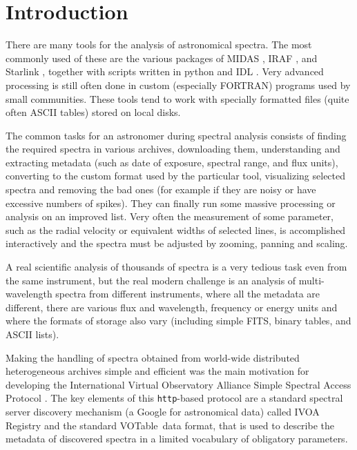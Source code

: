 \documentclass[final,authoryear,5p,times,twocolumn]{elsarticle}
\newcommand{\ssap}{\texttt{SSAP}}
\newcommand{\votable}{VOTable}
\newcommand{\ascl}[1]{\href{http://www.ascl.net/#1}{ascl:#1}}
\begin{document}
\section{Introduction}

There are many tools for the analysis of astronomical spectra.  The most
commonly used of these are the various packages of MIDAS
\citep[][\ascl{1302.017}]{1992ASPC...25..115W}, IRAF
\citep[][\ascl{9911.002}]{2012ASPC..461..595F}, and Starlink
\citep[][\ascl{1110.012}]{1982QJRAS..23..485D}, together with scripts
written in python \citep[e.g.,][]{2013A&A...558A..33A} and IDL \citep[e.g.,][]{1993ASPC...52..246L}.
Very advanced processing is still often done in custom
(especially FORTRAN) programs used by small communities.  These tools tend to
work with specially formatted files (quite often ASCII tables) stored on local
disks.

The common tasks for an astronomer during spectral analysis consists of finding
the required spectra in various archives, downloading them, understanding and
extracting metadata (such as date of exposure, spectral range, and flux units),
converting to the custom format used by the particular tool, visualizing
selected spectra and  removing the bad ones (for example if they are
noisy or have excessive numbers of spikes). They can finally
run some massive processing or analysis on an
improved list.  Very often the measurement of some parameter, such as the radial
velocity or equivalent widths of selected lines, is accomplished interactively
and the spectra must be adjusted by zooming, panning and scaling.

A real scientific analysis of thousands of spectra is a very
tedious task even from the same instrument, but the real modern challenge is an
analysis of multi-wavelength spectra from different instruments, where all the
metadata are different, there are various flux and wavelength, frequency or
energy units  and where the formats of storage also vary (including simple FITS, binary
tables, and ASCII lists).

Making the handling of spectra obtained from world-wide distributed
heterogeneous archives simple and efficient was the main motivation for
developing the International Virtual Observatory Alliance Simple Spectral
Access Protocol \citep[IVOA \ssap;][]{ssap}. The key elements of this
\texttt{http}-based protocol are a standard spectral server discovery mechanism (a
Google for astronomical data) called IVOA Registry \citep{registry} and  the
standard \votable\ data format\citep{2004tivo.conf..118O},
that is used to describe the metadata of discovered spectra in a limited vocabulary of
obligatory parameters.
\end{document}

